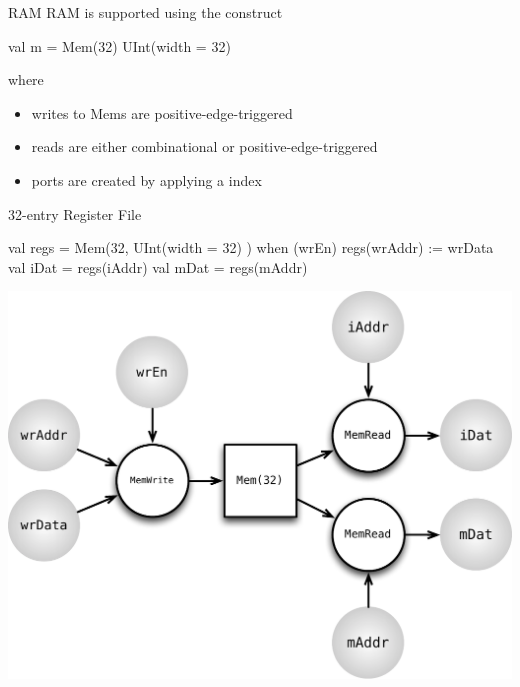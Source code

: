 \documentclass[xcolor=pdflatex,dvipsnames,table]{beamer}
\begin{document}
\begin{frame}[fragile]{RAM}
RAM is supported using the  construct

\begin{scala}
val m = Mem(32){ UInt(width = 32) }
\end{scala}

\noindent
where
\begin{itemize}
\item writes to Mems are positive-edge-triggered
\item reads are either combinational or positive-edge-triggered
\item ports are created by applying a  index
\end{itemize}
\end{frame}

\begin{frame}[fragile]{32-entry Register File}

\begin{scala}
val regs = Mem(32, UInt(width = 32) )
when (wrEn) {
  regs(wrAddr) := wrData
}
val iDat = regs(iAddr)
val mDat = regs(mAddr)
\end{scala}

\begin{center}
\includegraphics[height=0.55\textheight]{figs/mem.pdf} 
\end{center}

\end{frame}
\end{document}
